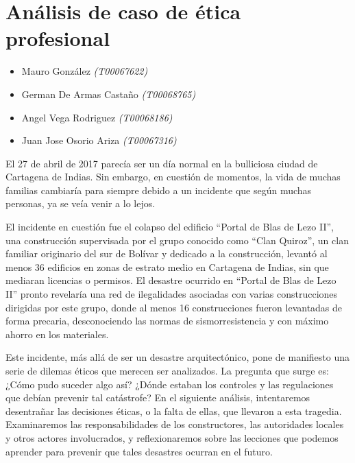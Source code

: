 \documentclass[letterpaper, 12pt]{article}
\begin{document}
\section*{Análisis de caso de ética profesional}

\noindent\makebox[\linewidth]{\rule{\textwidth}{0.4pt}}

\begin{itemize}[label=$\triangleright$]
      \item Mauro González \textit{(T00067622)}
      \item German De Armas Castaño \textit{(T00068765)}
      \item Angel Vega Rodriguez \textit{(T00068186)}
      \item Juan Jose Osorio Ariza \textit{(T00067316)}
\end{itemize}

\noindent\makebox[\linewidth]{\rule{\textwidth}{0.4pt}}

\nocite{Batista_2022}
\nocite{Hoyos_2023}
\nocite{LilianaCarmen}
\nocite{vera2019revision}


El 27 de abril de 2017 parecía ser un día normal en la
bulliciosa ciudad de Cartagena de Indias. Sin embargo, en
cuestión de momentos, la vida de muchas familias cambiaría
para siempre debido a un incidente que según muchas
personas, ya se veía venir a lo lejos.

El incidente en cuestión fue el colapso del edificio
``Portal de Blas de Lezo II'', una construcción supervisada
por el grupo conocido como ``Clan Quiroz'', un clan
familiar originario del sur de Bolívar y dedicado a la
construcción, levantó al menos 36 edificios en zonas de
estrato medio en Cartagena de Indias, sin que mediaran
licencias o permisos. El desastre ocurrido en ``Portal de
Blas de Lezo II'' pronto revelaría una red de ilegalidades
asociadas con varias construcciones dirigidas por este
grupo, donde al menos 16 construcciones fueron levantadas
de forma precaria, desconociendo las normas de
sismorresistencia y con máximo ahorro en los materiales.

Este incidente, más allá de ser un desastre arquitectónico,
pone de manifiesto una serie de dilemas éticos que merecen
ser analizados. La pregunta que surge es: ¿Cómo pudo
suceder algo así? ¿Dónde estaban los controles y las
regulaciones que debían prevenir tal catástrofe? En el
siguiente análisis, intentaremos desentrañar las decisiones
éticas, o la falta de ellas, que llevaron a esta tragedia.
Examinaremos las responsabilidades de los constructores,
las autoridades locales y otros actores involucrados, y
reflexionaremos sobre las lecciones que podemos aprender
para prevenir que tales desastres ocurran en el futuro.
\end{document}
